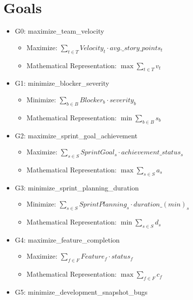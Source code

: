 \documentclass{article}
\begin{document}
\section{Goals}
\begin{itemize}
    \item G0: maximize\_team\_velocity
        \begin{itemize}
            \item Maximize: $\sum_{t \in T} Velocity_{t} \cdot avg.\_story\_points_{t}$
            \item Mathematical Representation: $\max \sum_{t \in T} v_{t}$
        \end{itemize}
    \item G1: minimize\_blocker\_severity
        \begin{itemize}
            \item Minimize: $\sum_{b \in B} Blocker_{b} \cdot severity_{b}$
            \item Mathematical Representation: $\min \sum_{b \in B} s_{b}$
        \end{itemize}
    \item G2: maximize\_sprint\_goal\_achievement
        \begin{itemize}
            \item Maximize: $\sum_{s \in S} SprintGoal_{s} \cdot achievement\_status_{s}$
            \item Mathematical Representation: $\max \sum_{s \in S} a_{s}$
        \end{itemize}
    \item G3: minimize\_sprint\_planning\_duration
        \begin{itemize}
            \item Minimize: $\sum_{s \in S} SprintPlanning_{s} \cdot duration\_(min)_{s}$
            \item Mathematical Representation: $\min \sum_{s \in S} d_{s}$
        \end{itemize}
    \item G4: maximize\_feature\_completion
        \begin{itemize}
            \item Maximize: $\sum_{f \in F} Feature_{f} \cdot status_{f}$
            \item Mathematical Representation: $\max \sum_{f \in F} c_{f}$
        \end{itemize}
    \item G5: minimize\_development\_snapshot\_bugs
        \begin{itemize}

\end{itemize}
\end{itemize}
\end{document}
